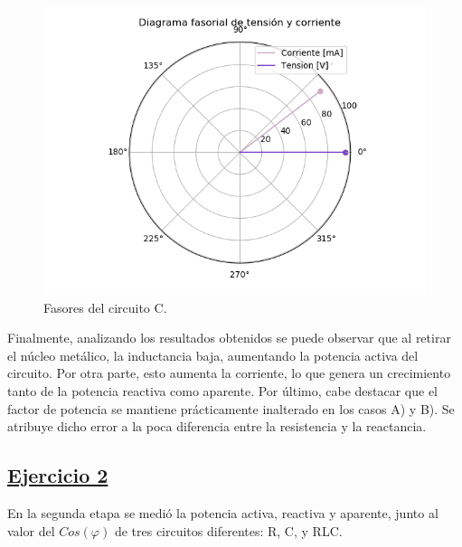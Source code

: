 \documentclass[a4paper]{article}
\begin{document}
\begin{figure}[H]
\centering
\begin{minipage}{.5\textwidth}
	\centering
	\includegraphics[width=1.2\linewidth]{Fasorial-1C.png}
	\caption{Fasores del circuito C.}
	\label{fig:faso-1c}
\end{minipage}
\end{figure}

Finalmente, analizando los resultados obtenidos se puede observar que al retirar el núcleo metálico, la inductancia baja, aumentando la potencia activa del circuito. Por otra parte, esto aumenta la corriente, lo que genera un crecimiento tanto de la potencia reactiva como aparente. Por último, cabe destacar que el factor de potencia se mantiene prácticamente inalterado en los casos A) y B). Se atribuye dicho error a la poca diferencia entre la resistencia y la reactancia.

\subsection*{\underline{Ejercicio 2}}

En la segunda etapa se medió la potencia activa, reactiva y aparente, junto al valor del $Cos(\varphi)$ de tres circuitos diferentes: R, C, y RLC.
\end{document}
